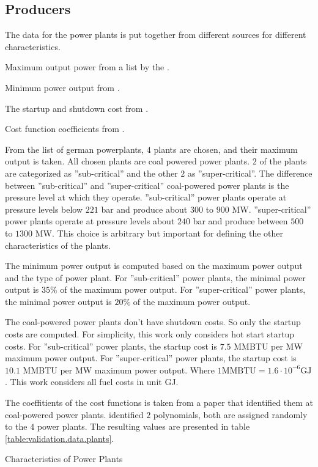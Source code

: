 \subsection{Producers}

The data for the power plants is put together from different sources for different characteristics.
\begin{enumerate*}[label=(\roman*)]
  \item Maximum output power from a list by the \citeauthor{Kraftwerkliste2020}. \cite{Kraftwerkliste2020}
  \item Minimum power output from \cite{Schroder2013}.
  \item The startup and shutdown cost from \cite{Kumar2012}.
  \item Cost function coefficients from \cite{Alrashidi2009}.
\end{enumerate*}

From the list of german powerplants, $4$ plants are chosen, and their maximum output is taken.
All chosen plants are coal powered power plants.
\cite{Kraftwerkliste2020}
$2$ of the plants are categorized as ''sub-critical'' and the other $2$ as ''super-critical''.
The difference between ''sub-critical'' and ''super-critical'' coal-powered power plants is the pressure level at which they operate.
''sub-critical'' power plants operate at pressure levels below $221$ bar and produce about $300$ to $900$ MW.
''super-critical'' power plants operate at pressure levels about $240$ bar and produce between $500$ to $1300$ MW.
\cite{Kumar2012, Schroder2013}
This choice is arbitrary but important for defining the other characteristics of the plants.

The minimum power output is computed based on the maximum power output and the type of power plant.
For ''sub-critical'' power plants, the minimal power output is $35\%$ of the maximum power output.
For ''super-critical'' power plants, the minimal power output is $20\%$ of the maximum power output.
\cite{Schroder2013}

The coal-powered power plants don't have shutdown costs.
So only the startup costs are computed.
For simplicity, this work only considers hot start startup costs.
For ''sub-critical'' power plants, the startup cost is $7.5$ MMBTU per MW maximum power output.
For ''super-critical'' power plants, the startup cost is $10.1$ MMBTU per MW maximum power output.
\cite{Kumar2012}
Where $1 \text{MMBTU} = 1.6 \cdot 10^{-6} \text{GJ}$.
This work considers all fuel costs in unit GJ.

The coeffitients of the cost functions is taken from a paper that identified them at coal-powered power plants.
\cite{Alrashidi2009}
\citeauthor{Alrashidi2009} identified $2$ polynomials, both are assigned randomly to the $4$ power plants.
The resulting values are presented in table \ref{table:validation.data.plants}.

\begin{table}[ht]
  \centering
  
  \caption{Characteristics of Power Plants}
  \label{table:validation.data.plants}
\end{table}
